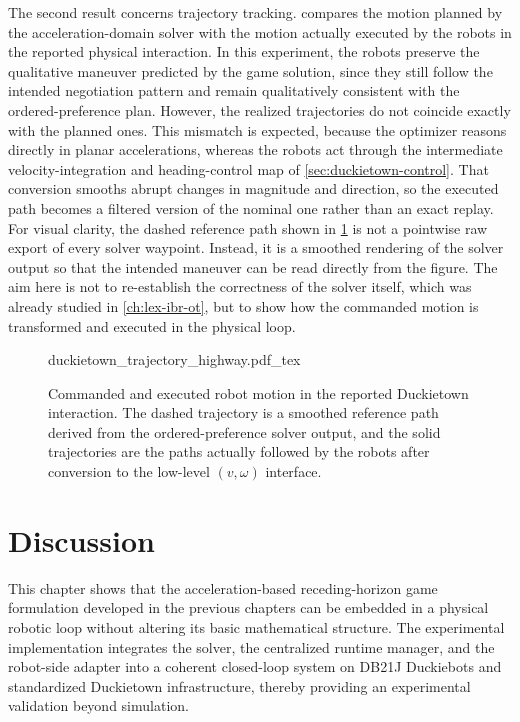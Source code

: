 The second result concerns trajectory tracking.
 compares the motion planned by the acceleration-domain solver with the motion
actually executed by the robots in the reported physical interaction.
In this experiment, the robots preserve the qualitative maneuver predicted by the game solution, since they still follow
the intended negotiation pattern and remain qualitatively consistent with the ordered-preference plan.
However, the realized trajectories do not coincide exactly with the planned ones.
This mismatch is expected, because the optimizer reasons directly in planar accelerations, whereas the robots act
through the intermediate velocity-integration and heading-control map of \cref{sec:duckietown-control}.
That conversion smooths abrupt changes in magnitude and direction, so the executed path becomes a filtered version
of the nominal one rather than an exact replay.
For visual clarity, the dashed reference path shown in \cref{fig:duckietown_trajectory} is not a pointwise raw
export of every solver waypoint.
Instead, it is a smoothed rendering of the solver output so that the intended maneuver can be read
directly from the figure.
The aim here is not to re-establish the correctness of the solver itself, which was already studied
in \cref{ch:lex-ibr-ot}, but to show how the commanded motion is transformed and executed in the physical loop.

\begin{figure}[!t]
\centering
    \def\svgwidth{0.86\linewidth}
    {duckietown_trajectory_highway.pdf_tex}
\caption{Commanded and executed robot motion in the reported Duckietown interaction.
The dashed trajectory is a smoothed reference path derived from the ordered-preference solver output, and the
solid trajectories are the paths actually followed by the robots after conversion to the low-level \((v,\omega)\)
interface.}
\label{fig:duckietown_trajectory}
\end{figure}

\section{Discussion}

This chapter shows that the acceleration-based receding-horizon game formulation developed in the
previous chapters can be embedded in a physical robotic loop without altering its basic
mathematical structure.
The experimental implementation integrates the solver, the centralized runtime manager, and the robot-side
adapter into a coherent closed-loop system on DB21J Duckiebots and standardized Duckietown infrastructure,
thereby providing an experimental validation beyond simulation.

